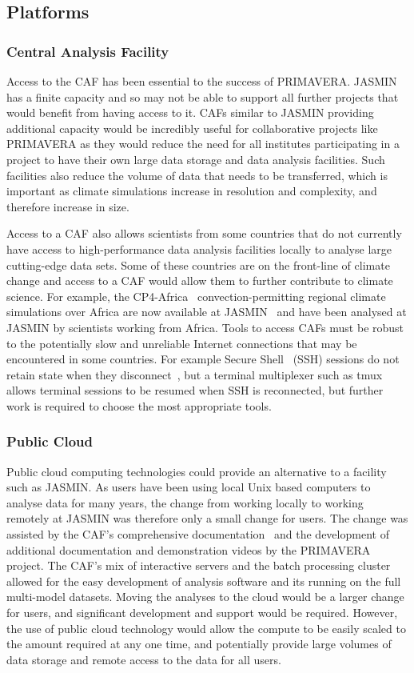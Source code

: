 \documentclass[gmd, manuscript]{copernicus}
\begin{document}
\subsection{Platforms}

\subsubsection{Central Analysis Facility}
Access to the CAF has been essential to the success of PRIMAVERA. JASMIN has a finite capacity and so may not be able to support all further projects that would benefit from having access to it. CAFs similar to JASMIN providing additional capacity would be incredibly useful for collaborative projects like PRIMAVERA as they would reduce the need for all institutes participating in a project to have their own large data storage and data analysis facilities. Such facilities also reduce the volume of data that needs to be transferred, which is important as climate simulations increase in resolution and complexity, and therefore increase in size.

Access to a CAF also allows scientists from some countries that do not currently have access to high-performance data analysis facilities locally to analyse large cutting-edge data sets. Some of these countries are on the front-line of climate change and access to a CAF would allow them to further contribute to climate science. For example, the CP4-Africa~\citep{Stratton2018} convection-permitting regional climate simulations over Africa are now available at JASMIN~\citep{Senior2019} and have been analysed at JASMIN by scientists working from Africa. Tools to access CAFs must be robust to the potentially slow and unreliable Internet connections that may be encountered in some countries. For example Secure Shell~\citep{ssh} (SSH) sessions do not retain state when they disconnect~\citep{senior_catherine_2020_4316467}, but a terminal multiplexer such as tmux~\citep{tmux} allows terminal sessions to be resumed when SSH is reconnected, but further work is required to choose the most appropriate tools. 

\subsubsection{Public Cloud}
Public cloud computing technologies could provide an alternative to a facility such as JASMIN. As users have been using local Unix based computers to analyse data for many years, the change from working locally to working remotely at JASMIN was therefore only a small change for users. The change was assisted by the CAF's comprehensive documentation~\citep{JASMINdocs} and the development of additional documentation and demonstration videos by the PRIMAVERA project. The CAF's mix of interactive servers and the batch processing cluster allowed for the easy development of analysis software and its running on the full multi-model datasets. Moving the analyses to the cloud would be a larger change for users, and significant development and support would be required. However, the use of public cloud technology would allow the compute to be easily scaled to the amount required at any one time, and potentially provide large volumes of data storage and remote access to the data for all users.
\end{document}
